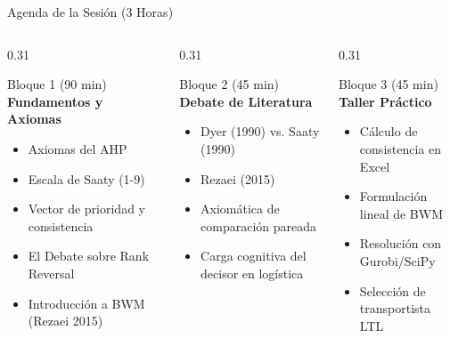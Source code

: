 \documentclass[aspectratio=169, 10pt]{beamer}
\begin{document}
\begin{frame}{Agenda de la Sesión (3 Horas)}
    \begin{columns}[T]
        \begin{column}{0.31\textwidth}
            \begin{block}{Bloque 1 (90 min)}
                \textbf{Fundamentos y Axiomas}
                \begin{itemize}
                    \scriptsize
                    \item Axiomas del AHP
                    \item Escala de Saaty (1-9)
                    \item Vector de prioridad y consistencia
                    \item El Debate sobre Rank Reversal
                    \item Introducción a BWM (Rezaei 2015)
                \end{itemize}
            \end{block}
        \end{column}
        
        \begin{column}{0.31\textwidth}
            \begin{exampleblock}{Bloque 2 (45 min)}
                \textbf{Debate de Literatura}
                \begin{itemize}
                    \scriptsize
                    \item Dyer (1990) vs. Saaty (1990)
                    \item Rezaei (2015)
                    \item Axiomática de comparación pareada
                    \item Carga cognitiva del decisor en logística
                \end{itemize}
            \end{exampleblock}
        \end{column}
        
        \begin{column}{0.31\textwidth}
            \begin{alertblock}{Bloque 3 (45 min)}
                \textbf{Taller Práctico}
                \begin{itemize}
                    \scriptsize
                    \item Cálculo de consistencia en Excel
                    \item Formulación lineal de BWM
                    \item Resolución con Gurobi/SciPy
                    \item Selección de transportista LTL
                \end{itemize}
            \end{alertblock}
        \end{column}
    \end{columns}
\end{frame}
\end{document}
